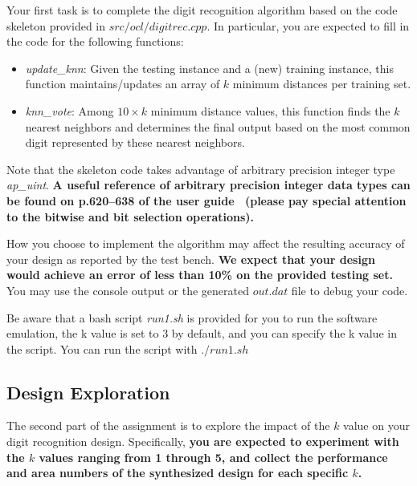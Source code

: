 \documentclass[paper=letter, fontsize=10pt]{scrartcl} %
\numberwithin{equation}{section} %
\numberwithin{figure}{section} %
\numberwithin{table}{section} %
\begin{document}
Your first task is to complete the digit recognition algorithm based on the code skeleton provided in $src/ocl/digitrec.cpp$. 
In particular, you are expected to fill in the code for the following functions:
\begin{itemize}
\item \textit{update\_knn}: Given the testing instance and a (new) training instance, this function maintains/updates an array of $k$ minimum distances per training set.
\item \textit{knn\_vote}: Among $10 \times k$ minimum distance values, this function finds the $k$ nearest neighbors and determines the final output based on the most common digit represented by these nearest neighbors.
\end{itemize}

Note that the skeleton code takes advantage of arbitrary precision integer type \textit{ap\_uint}. \textbf{A useful reference of arbitrary precision integer data types can be found on p.620--638 of the user guide~\cite{ug902} (please pay special attention to the bitwise and bit selection operations).}

How you choose to implement the algorithm may affect the resulting accuracy of your design as reported by the test bench. \textbf{We expect that your design would achieve an error of less than 10\% on the provided testing set.} You may use the console output or the generated $out.dat$ file to debug your code.

Be aware that a bash script \textit{run1.sh} is provided for you to run the software emulation, the k value is set to 3 by default, and you can specify the k value in the script. You can run the script with $./run1.sh$

\subsection{Design Exploration}
\label{design-expl}
The second part of the assignment is to explore the impact of the $k$ value on your digit recognition design. Specifically, \textbf{you are expected to experiment with the $k$ values ranging from 1 through 5, and collect the performance and area numbers of the synthesized design for each specific $k$.} 
\end{document}
